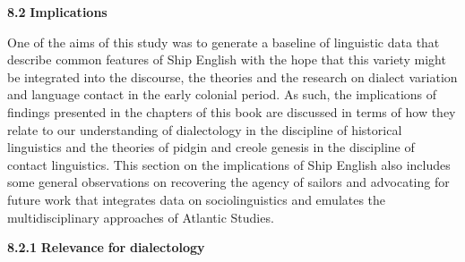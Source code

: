 \textbf{8.2} \textbf{Implications}

  One of the aims of this study was to generate a baseline of linguistic data that describe common features of Ship English with the hope that this variety might be integrated into the discourse, the theories and the research on dialect variation and language contact in the early colonial period. As such, the implications of findings presented in the chapters of this book are discussed in terms of how they relate to our understanding of dialectology in the discipline of historical linguistics and the theories of pidgin and creole genesis in the discipline of contact linguistics. This section on the implications of Ship English also includes some general observations on recovering the agency of sailors and advocating for future work that integrates data on sociolinguistics and emulates the multidisciplinary approaches of Atlantic Studies.

\textbf{8.2.1} \textbf{Relevance} \textbf{for} \textbf{dialectology}

